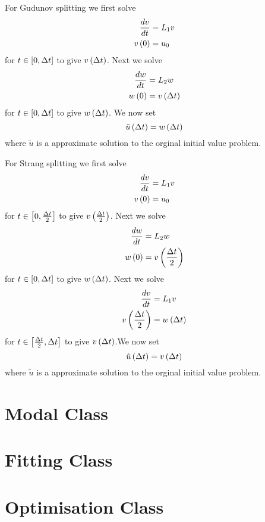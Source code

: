 For Gudunov splitting we first solve
\begin{align}
   \dfrac{ d v}{d t} &=L_{1}v \\
   v\left( 0 \right) &=u_{0}
\end{align}
for $t\in\left[ 0,\Delta t \right]$ to give $ v\left( \Delta t \right) $. Next we solve
\begin{align}
   \dfrac{ d w}{d t} &=L_{2}w \\
   w\left( 0 \right) &= v\left( \Delta t \right) 
\end{align}
for $t\in\left[ 0,\Delta t \right]$ to give $ w\left( \Delta t \right) $. We now set
\begin{equation}
 \tilde{u}\left( \Delta t \right) = w\left( \Delta t \right) 
\end{equation}
where $\tilde{u}$ is a approximate solution to the orginal initial value
problem.

For Strang splitting we first solve
\begin{align}
   \dfrac{ d v}{d t} &=L_{1}v \\
   v\left( 0 \right) &=u_{0}
\end{align}
for $t\in\left[ 0,\frac{\Delta t}{2} \right]$ to give $ v\left( \frac{\Delta t}{2} \right) $. Next we solve
\begin{align}
   \dfrac{ d w}{d t} &=L_{2}w \\
   w\left( 0 \right) &= v\left( \frac{\Delta t}{2} \right) 
\end{align}
for $t\in\left[ 0,\Delta t \right]$ to give $ w\left( \Delta t \right) $. Next we solve
\begin{align}
   \dfrac{ d v}{d t} &=L_{1}v \\
   v\left( \frac{\Delta t}{2} \right) &= w\left( \Delta t \right) 
\end{align}
for $t\in\left[ \frac{\Delta t}{2},\Delta t \right]$ to give $ v\left( \Delta t \right) $.We now set
\begin{equation}
 \tilde{u}\left( \Delta t \right) = v\left( \Delta t \right) 
\end{equation}
where $\tilde{u}$ is a approximate solution to the orginal initial value
problem.

\section{Modal Class}

\section{Fitting Class}

\section{Optimisation Class}
